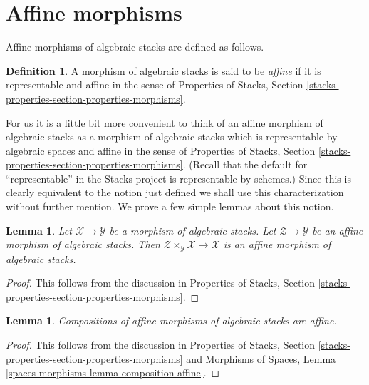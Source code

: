 \documentclass{stacks-project}
\theoremstyle{plain}
\newtheorem{lemma}[subsection]{Lemma}
\theoremstyle{definition}
\newtheorem{definition}[subsection]{Definition}
\theoremstyle{remark}
\numberwithin{equation}{subsection}
\begin{document}
\section{Affine morphisms}
\label{section-affine}

\noindent
Affine morphisms of algebraic stacks are defined as follows.

\begin{definition}
\label{definition-affine}
A morphism of algebraic stacks is said to be {\it affine}
if it is representable and affine in the sense of
Properties of Stacks, Section
\ref{stacks-properties-section-properties-morphisms}.
\end{definition}

\noindent
For us it is a little bit more convenient to think of an affine
morphism of algebraic stacks as a morphism of algebraic stacks which is
representable by algebraic spaces and affine in the sense of
Properties of Stacks, Section
\ref{stacks-properties-section-properties-morphisms}.
(Recall that the default for ``representable'' in the Stacks project
is representable by schemes.)
Since this is clearly equivalent to the notion just defined we shall
use this characterization without further mention.
We prove a few simple lemmas about this notion.

\begin{lemma}
\label{lemma-base-change-affine}
Let $\mathcal{X} \to \mathcal{Y}$ be a morphism of algebraic stacks.
Let $\mathcal{Z} \to \mathcal{Y}$ be an affine morphism of algebraic
stacks. Then $\mathcal{Z} \times_\mathcal{Y} \mathcal{X} \to \mathcal{X}$
is an affine morphism of algebraic stacks.
\end{lemma}

\begin{proof}
This follows from the discussion in
Properties of Stacks, Section
\ref{stacks-properties-section-properties-morphisms}.
\end{proof}

\begin{lemma}
\label{lemma-composition-affine}
Compositions of affine morphisms of algebraic stacks are affine.
\end{lemma}

\begin{proof}
This follows from the discussion in
Properties of Stacks, Section
\ref{stacks-properties-section-properties-morphisms}
and
Morphisms of Spaces, Lemma \ref{spaces-morphisms-lemma-composition-affine}.
\end{proof}
\end{document}
